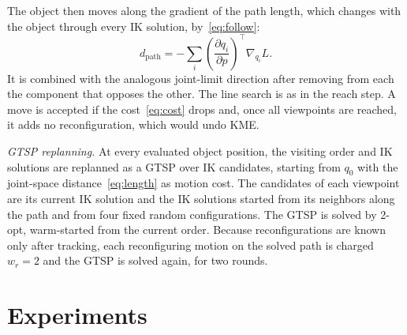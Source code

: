 \documentclass[letterpaper, journal, twoside]{IEEEtran}
\begin{document}
The object then moves along the gradient of the path length, which changes with the object through every IK solution, by~\eqref{eq:follow}:
\begin{equation}
d_{\text{path}} = -\sum_i \left(\frac{\partial q_i}{\partial p}\right)^{\!\top} \nabla_{q_i} L .
\end{equation}
It is combined with the analogous joint-limit direction after removing from each the component that opposes the other. The line search is as in the reach step. A move is accepted if the cost~\eqref{eq:cost} drops and, once all viewpoints are reached, it adds no reconfiguration, which would undo KME.

\emph{GTSP replanning.}\label{sec:gtsp} At every evaluated object position, the visiting order and IK solutions are replanned as a GTSP over IK candidates, starting from $q_0$ with the joint-space distance~\eqref{eq:length} as motion cost. The candidates of each viewpoint are its current IK solution and the IK solutions started from its neighbors along the path and from four fixed random configurations. The GTSP is solved by 2-opt, warm-started from the current order. Because reconfigurations are known only after tracking, each reconfiguring motion on the solved path is charged $w_r = 2$ and the GTSP is solved again, for two rounds.

\section{Experiments}
\end{document}
